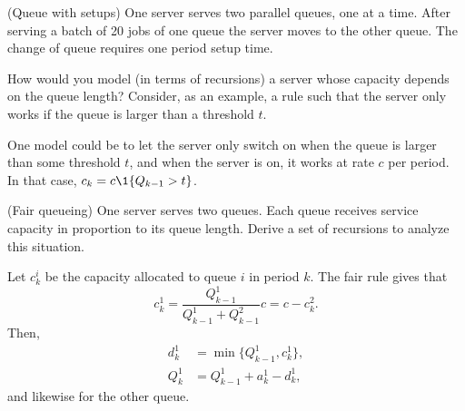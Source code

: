 \begin{question}[use=false](Queue with setups)
  One server serves two parallel queues, one at a time. After serving
  a batch of 20 jobs of one queue the server moves to the other
  queue. The change of queue requires one period setup time.
  \begin{solution}
  \end{solution}
\end{question}


\begin{question}
  How would you model (in terms of recursions) a server whose capacity
  depends on the queue length? Consider, as an example, a rule such
  that the server only works if the queue is larger than a threshold $t$. 

  \begin{solution}
    One model could be to let the server only switch on when the queue
    is larger than some threshold $t$, and when the server is on, it
    works at rate $c$ per period. In that case,
    $c_k = c\1{Q_{k-1} > t}$.
  \end{solution}
\end{question}

\begin{question}(Fair queueing) One server serves two queues. Each
  queue receives service capacity in proportion to its queue length. Derive a set of recursions to analyze this situation.
  \begin{solution}
    Let $c_k^i$ be the capacity allocated to queue $i$ in period $k$. The fair rule gives that 
    \begin{equation*}
      c_k^1 = \frac{Q_{k-1}^1}{Q_{k-1}^1 + Q_{k-1}^2} c = c - c_k^2. 
    \end{equation*}
Then, 
\begin{equation*}
  \begin{split}
      d_k^1 &= \min\{Q_{k-1}^1, c^1_k\}, \\
Q_k^1 &= Q_{k-1}^1+a_k^1  - d_k^1,
  \end{split}
\end{equation*}
and likewise for the other queue.
  \end{solution}
  \end{question}

